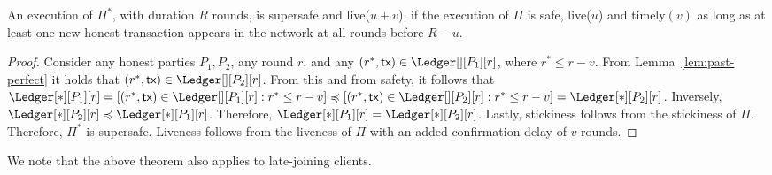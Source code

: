 \begin{theorem} \label{thm:timeliness-to-supersafety}
  An execution of $\Pi^*$, with duration $R$ rounds, is supersafe
  and live($u + v$), if the execution of
  $\Pi$ is safe, live($u$) and timely$(v)$
  as long as at least one new honest transaction appears in the
  network at all rounds before $R - u$.
\end{theorem}
\begin{proof}
  Consider any honest parties $P_1,P_2$, any round $r$, and any
  $(r^*, \tx) \in \Ledger[][P_1][r]$, where $r^* \leq r - v$.
  From Lemma~\ref{lem:past-perfect} it holds that
  $(r^*, \tx) \in \Ledger[][P_2][r]$.
  From this and from safety, it follows that
  $\Ledger[*][P_1][r] = [(r^*, \tx) \in \Ledger[][P_1][r]: r^* \leq r - v] \preccurlyeq
  [(r^*, \tx) \in \Ledger[][P_2][r]: r^* \leq r - v] = \Ledger[*][P_2][r]$.
  Inversely, $\Ledger[*][P_2][r] \preccurlyeq \Ledger[*][P_1][r]$.
  Therefore, $\Ledger[*][P_1][r] = \Ledger[*][P_2][r]$.
  Lastly, stickiness follows from the stickiness of $\Pi$.
  Therefore, $\Pi^*$ is supersafe.
  Liveness follows from the liveness of $\Pi$ with an added
  confirmation delay of $v$ rounds.
  \Qed
\end{proof}

We note that the above theorem also applies to late-joining clients.

